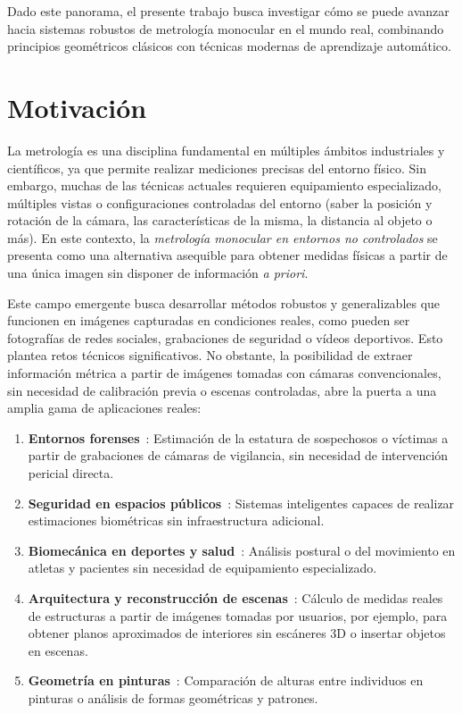 Dado este panorama, el presente trabajo busca investigar cómo se puede avanzar hacia sistemas robustos de metrología monocular en el mundo real,
combinando principios geométricos clásicos con técnicas modernas de aprendizaje automático.

\section{Motivación}
La metrología es una disciplina fundamental en múltiples ámbitos industriales y científicos, ya que permite realizar mediciones precisas del entorno físico.
Sin embargo, muchas de las técnicas actuales requieren equipamiento especializado, múltiples vistas o configuraciones controladas del entorno (saber la posición y rotación de la cámara, las características de la misma, la distancia al objeto o más).
En este contexto, la \emph{metrología monocular en entornos no controlados} se presenta como una alternativa asequible para obtener medidas físicas a partir de una única imagen
sin disponer de información \emph{a priori}.
\par
Este campo emergente busca desarrollar métodos robustos y generalizables que funcionen en imágenes capturadas en condiciones reales, como pueden ser
fotografías de redes sociales, grabaciones de seguridad o vídeos deportivos. Esto plantea retos técnicos significativos.
No obstante, la posibilidad de extraer información métrica a partir de imágenes tomadas con cámaras convencionales, sin necesidad de calibración previa o escenas controladas,
abre la puerta a una amplia gama de aplicaciones reales:
\begin{enumerate}
  \item \textbf{Entornos forenses}~\cite{CriminisiApplications}: Estimación de la estatura de sospechosos o víctimas a partir de grabaciones de cámaras de vigilancia, sin necesidad de intervención pericial directa.
  \item \textbf{Seguridad en espacios públicos}~\cite{CriminisiApplications}: Sistemas inteligentes capaces de realizar estimaciones biométricas sin infraestructura adicional.
    \item \textbf{Biomecánica en deportes y salud}~\cite{SingleViewExerciseQuantification}: Análisis postural o del movimiento en atletas y pacientes sin necesidad de equipamiento especializado.
    \item \textbf{Arquitectura y reconstrucción de escenas}~\cite{HoiemPopUp, CriminisiApplications, CriminisiReconstruction}: Cálculo de medidas reales de estructuras a partir de imágenes tomadas por usuarios, por ejemplo, para obtener planos aproximados de interiores sin escáneres 3D o insertar objetos en escenas.
    \item \textbf{Geometría en pinturas}~\cite{CriminisiApplications, CriminisiPaintings, HoiemObjectsInPerspective, ObjectsIntoPhotos}: Comparación de alturas entre individuos en pinturas o análisis de formas geométricas y patrones.
\end{enumerate}

